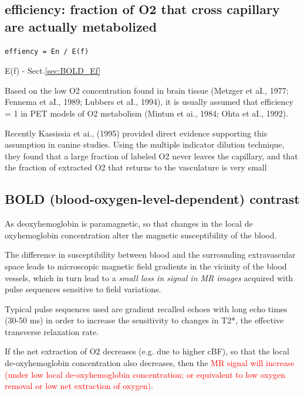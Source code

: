\subsection{efficiency: fraction of O2 that cross capillary are actually
metabolized}
\label{sec:BOLD_efficiency}

\begin{verbatim}
effiency = En / E(f)
\end{verbatim}
E(f) - Sect.\ref{sec:BOLD_Ef}

Based on the low O2 concentration found in brain tissue (Metzger et aI., 1977;
Fennema et aI., 1989; Lubbers et aI., 1994), it is usually assumed that
efficiency = 1 in PET models of O2 metabolism (Mintun et ai., 1984; Ohta et aI.,
1992).

Recently Kassissia et ai., (1995) provided direct evidence supporting this
assumption in canine studies. Using the multiple indicator dilution technique,
they found that a large fraction of labeled O2 never leaves the capillary, and
that the fraction of extracted O2 that returns to the vasculature is very small


\subsection{BOLD (blood-oxygen-level-dependent) contrast}
\label{sec:BOLD}

As deoxyhemoglobin is paramagnetic, so that changes in the local de
oxyhemoglobin concentration alter the magnetic susceptibility of the blood.

The difference in susceptibility between blood and the surrounding
extravascular space leads to microscopic magnetic
field gradients in the vicinity of the blood vessels,
which in turn lead to a {\it small loss in signal in MR images}
acquired with pulse sequences sensitive to field variations.

Typical pulse sequences used are gradient recalled echoes with long echo times
(30-50 ms) in order to increase the sensitivity to changes in T2*, the effective
transverse relaxation rate. 

If the net extraction of O2 decreases (e.g. due to higher cBF), so that the
local de-oxyhemoglobin concentration also decreases, then the \textcolor{red}{MR
signal will increase (under low local de-oxyhemoglobin concentration; or
equivalent to low oxygen removal or low net extraction of oxygen)}.

